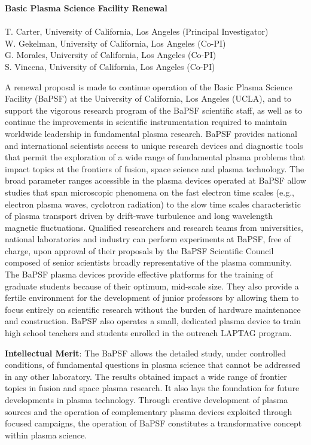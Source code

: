\documentclass[11pt]{article}
\date{}
\title{}
\begin{document}
%
\begin{center}
{\bfseries Basic Plasma Science Facility Renewal}\\
\hfill \\
T. Carter, University of California, Los Angeles (Principal Investigator)\\
W. Gekelman, University of California, Los Angeles (Co-PI)\\
G. Morales, University of California, Los Angeles (Co-PI)\\
S. Vincena, University of California, Los Angeles (Co-PI)\\
\end{center}

A renewal proposal is made to continue operation of the Basic Plasma
Science Facility (BaPSF) at the University of California, Los Angeles
(UCLA), and to support the vigorous research program of the BaPSF
scientific staff, as well as to continue the improvements in
scientific instrumentation required to maintain worldwide leadership
in fundamental plasma research. BaPSF provides national and
international scientists access to unique research devices and
diagnostic tools that permit the exploration of a wide range of
fundamental plasma problems that impact topics at the frontiers of
fusion, space science and plasma technology. The broad parameter
ranges accessible in the plasma devices operated at BaPSF allow
studies that span microscopic phenomena on the fast electron time
scales (e.g., electron plasma waves, cyclotron radiation) to the slow
time scales characteristic of plasma transport driven by drift-wave
turbulence and long wavelength magnetic fluctuations.  Qualified
researchers and research teams from universities, national
laboratories and industry can perform experiments at BaPSF, free of
charge, upon approval of their proposals by the BaPSF Scientific
Council composed of senior scientists broadly representative of the
plasma community. The BaPSF plasma devices provide effective platforms
for the training of graduate students because of their optimum,
mid-scale size. They also provide a fertile environment for the
development of junior professors by allowing them to focus entirely on
scientific research without the burden of hardware maintenance and
construction. BaPSF also operates a small, dedicated plasma device to
train high school teachers and students enrolled in the outreach
LAPTAG program.  

{\bfseries Intellectual Merit}:  The BaPSF allows the detailed
study, under controlled conditions, of fundamental questions in plasma
science that cannot be addressed in any other laboratory. The results
obtained impact a wide range of frontier topics in fusion and space
plasma research. It also lays the foundation for future developments
in plasma technology. Through creative development of plasma sources
and the operation of complementary plasma devices exploited through
focused campaigns, the operation of BaPSF constitutes a transformative
concept within plasma science.  
\end{document}
